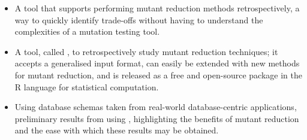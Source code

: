 \begin{itemize}


  \item A tool that supports performing mutant reduction methods retrospectively, a way to quickly identify trade-offs
      without having to understand the complexities of a mutation testing tool.



  \item A tool, called \mr, to retrospectively study mutant reduction techniques; it accepts a generalised input format,
    can easily be extended with new methods for mutant reduction, and is released as a free and open-source package in
    the R language for statistical computation.


  \item Using database schemas taken from real-world database-centric applications, preliminary results from using
    \mr, highlighting the benefits of mutant reduction and the ease with which these results may be obtained.

\end{itemize}



